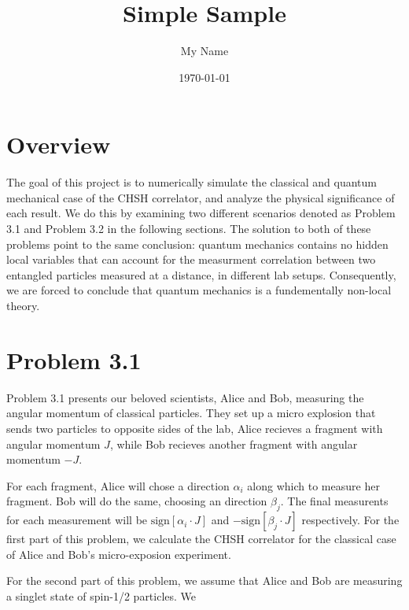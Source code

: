 \documentclass{article} %
\title{Simple Sample} %
\author{My Name} %
\date{\today} %
\begin{document}
\maketitle %

\section{Overview} %
The goal of this project is to numerically simulate the classical and quantum mechanical 
case of the CHSH correlator, and analyze the physical significance of each result. 
We do this by examining two different scenarios denoted as Problem 3.1 and Problem 3.2 in the 
following sections. The solution to both of these problems 
point to the same conclusion: quantum mechanics contains no hidden local variables that can account
for the measurment correlation between two entangled particles measured at a distance, 
in different lab setups. Consequently, we are forced to conclude that quantum mechanics is a 
fundementally non-local theory.

\section{Problem 3.1} 

Problem 3.1 presents our beloved scientists, Alice and Bob, measuring the angular momentum of classical particles. They set up a micro explosion that sends two particles to opposite sides of the lab, Alice recieves a fragment with angular momentum $J$, while Bob recieves another fragment with angular momentum $-J$. 

For each fragment, Alice will chose a direction $\alpha_{i}$ along which to measure her fragment. Bob will do the same, choosing an direction $\beta_{j}$. The final measurents for each measurement will be $\text{sign}[\alpha_{i} \cdot J]$ and $-\text{sign}[\beta_{j} \cdot J]$  respectively. For the first part of this problem, we calculate the CHSH correlator for the classical case of Alice and Bob's micro-exposion experiment. 

For the second part of this problem, we assume that Alice and Bob are measuring a singlet state of spin-1/2 particles. We 
\end{document}
